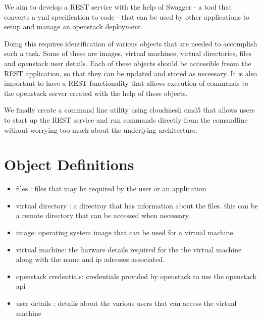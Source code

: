 We aim to develop a REST service with the help of Swagger - a tool
that converts a yml specification to code - that can be used by other
applications to setup and manage an openstack deployment.

Doing this requires identification of various objects that are needed
to accomplish such a task. Some of these are images, virtual machines,
virtual directories, files and openstack user details. Each of these
objects should be accessible freom the REST application, so that they
can be updated and stored as necessary. It is also important to have a
REST functionality that allows execution of commands to the openstack
server created with the help of these objects.

We finally create a command line utility using cloudmesh cmd5
that allows users to start up the REST service and run commands
directly from the comandline without worrying too much about the
underlying architecture.

\section{Object Definitions}

\begin{itemize}
\item files : files that may be required by the user or an
application

\item virtual directory : a directroy that has information
about the files. this can be a remote directory that can be accessed
when necessary.

\item image: operating system image that can be used
for a virtual machine

\item virtual machine: the harware details
required for the the virtual machine along with the name and ip
adresses associated.

\item openstack credentials: credentials
provided by openstack to use the openstack api

\item user details :
details about the various users that can access the virtual machine

\end{itemize}


 
